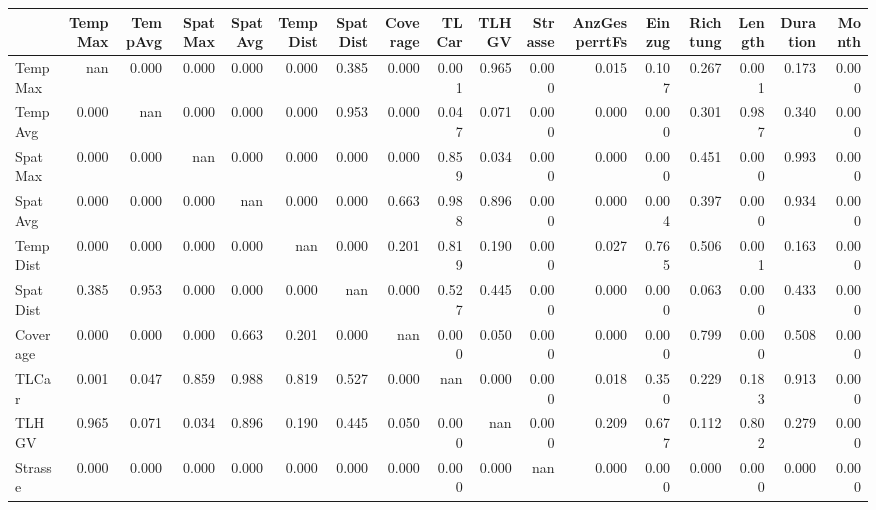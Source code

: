 \begin{tabular}{lrrrrrrrrrrrrrrrr}
\toprule
{} &  TempMax &  TempAvg &  SpatMax &  SpatAvg &  TempDist &  SpatDist &  Coverage &  TLCar &  TLHGV &  Strasse &  AnzGesperrtFs &  Einzug &  Richtung &  Length &  Duration &  Month \\
\midrule
TempMax       &      nan &    0.000 &    0.000 &    0.000 &     0.000 &     0.385 &     0.000 &  0.001 &  0.965 &    0.000 &          0.015 &   0.107 &     0.267 &   0.001 &     0.173 &  0.000 \\
TempAvg       &    0.000 &      nan &    0.000 &    0.000 &     0.000 &     0.953 &     0.000 &  0.047 &  0.071 &    0.000 &          0.000 &   0.000 &     0.301 &   0.987 &     0.340 &  0.000 \\
SpatMax       &    0.000 &    0.000 &      nan &    0.000 &     0.000 &     0.000 &     0.000 &  0.859 &  0.034 &    0.000 &          0.000 &   0.000 &     0.451 &   0.000 &     0.993 &  0.000 \\
SpatAvg       &    0.000 &    0.000 &    0.000 &      nan &     0.000 &     0.000 &     0.663 &  0.988 &  0.896 &    0.000 &          0.000 &   0.004 &     0.397 &   0.000 &     0.934 &  0.000 \\
TempDist      &    0.000 &    0.000 &    0.000 &    0.000 &       nan &     0.000 &     0.201 &  0.819 &  0.190 &    0.000 &          0.027 &   0.765 &     0.506 &   0.001 &     0.163 &  0.000 \\
SpatDist      &    0.385 &    0.953 &    0.000 &    0.000 &     0.000 &       nan &     0.000 &  0.527 &  0.445 &    0.000 &          0.000 &   0.000 &     0.063 &   0.000 &     0.433 &  0.000 \\
Coverage      &    0.000 &    0.000 &    0.000 &    0.663 &     0.201 &     0.000 &       nan &  0.000 &  0.050 &    0.000 &          0.000 &   0.000 &     0.799 &   0.000 &     0.508 &  0.000 \\
TLCar         &    0.001 &    0.047 &    0.859 &    0.988 &     0.819 &     0.527 &     0.000 &    nan &  0.000 &    0.000 &          0.018 &   0.350 &     0.229 &   0.183 &     0.913 &  0.000 \\
TLHGV         &    0.965 &    0.071 &    0.034 &    0.896 &     0.190 &     0.445 &     0.050 &  0.000 &    nan &    0.000 &          0.209 &   0.677 &     0.112 &   0.802 &     0.279 &  0.000 \\
Strasse       &    0.000 &    0.000 &    0.000 &    0.000 &     0.000 &     0.000 &     0.000 &  0.000 &  0.000 &      nan &          0.000 &   0.000 &     0.000 &   0.000 &     0.000 &  0.000 \\

\end{tabular}
